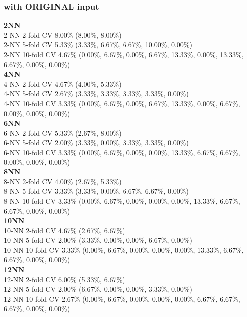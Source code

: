 \documentclass[11pt,a4paper]{article}
\begin{document}
\subsubsection{with ORIGINAL input}
\textbf{2NN }\\
2-NN 2-fold CV  8.00\%  (8.00\%, 8.00\%)\\  
2-NN 5-fold CV  5.33\%  (3.33\%, 6.67\%, 6.67\%, 10.00\%, 0.00\%)\\  
2-NN 10-fold CV  4.67\%  (0.00\%, 6.67\%, 0.00\%, 6.67\%, 13.33\%, 0.00\%, 13.33\%, 6.67\%, 0.00\%, 0.00\%)\\  
\textbf{4NN }\\
4-NN 2-fold CV  4.67\%  (4.00\%, 5.33\%)\\  
4-NN 5-fold CV  2.67\%  (3.33\%, 3.33\%, 3.33\%, 3.33\%, 0.00\%)\\  
4-NN 10-fold CV  3.33\%  (0.00\%, 6.67\%, 0.00\%, 6.67\%, 13.33\%, 0.00\%, 6.67\%, 0.00\%, 0.00\%, 0.00\%)\\  
\textbf{6NN }\\
6-NN 2-fold CV  5.33\%  (2.67\%, 8.00\%)\\  
6-NN 5-fold CV  2.00\%  (3.33\%, 0.00\%, 3.33\%, 3.33\%, 0.00\%)\\  
6-NN 10-fold CV  3.33\%  (0.00\%, 6.67\%, 0.00\%, 0.00\%, 13.33\%, 6.67\%, 6.67\%, 0.00\%, 0.00\%, 0.00\%)\\  
\textbf{8NN }\\
8-NN 2-fold CV  4.00\%  (2.67\%, 5.33\%)\\  
8-NN 5-fold CV  3.33\%  (3.33\%, 0.00\%, 6.67\%, 6.67\%, 0.00\%)\\  
8-NN 10-fold CV  3.33\%  (0.00\%, 6.67\%, 0.00\%, 0.00\%, 0.00\%, 13.33\%, 6.67\%, 6.67\%, 0.00\%, 0.00\%)\\  
\textbf{10NN }\\
10-NN 2-fold CV  4.67\%  (2.67\%, 6.67\%)\\  
10-NN 5-fold CV  2.00\%  (3.33\%, 0.00\%, 0.00\%, 6.67\%, 0.00\%)\\  
10-NN 10-fold CV  3.33\%  (0.00\%, 6.67\%, 0.00\%, 0.00\%, 0.00\%, 13.33\%, 6.67\%, 6.67\%, 0.00\%, 0.00\%)\\  
\textbf{12NN }\\
12-NN 2-fold CV  6.00\%  (5.33\%, 6.67\%)\\  
12-NN 5-fold CV  2.00\%  (6.67\%, 0.00\%, 0.00\%, 3.33\%, 0.00\%)\\  
12-NN 10-fold CV  2.67\%  (0.00\%, 6.67\%, 0.00\%, 0.00\%, 0.00\%, 6.67\%, 6.67\%, 6.67\%, 0.00\%, 0.00\%)\\  
\end{document}
